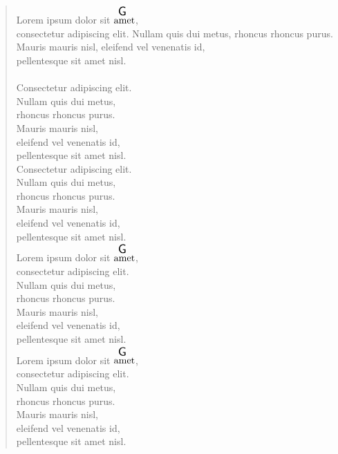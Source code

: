 \documentclass[twocolumn]{article}
\begin{document}
\begin{verse}

Lorem ipsum dolor sit $\overset{ \resizebox{0.3cm}{!}{\textsf{G}} }{\text{amet}}$, \\
consectetur adipiscing elit.
Nullam quis dui metus, 
rhoncus rhoncus purus. 
Mauris mauris nisl, 
eleifend vel venenatis id, \\
pellentesque sit amet nisl.\\

~\\

Consectetur adipiscing elit.\\
Nullam quis dui metus, \\
rhoncus rhoncus purus. \\
Mauris mauris nisl, \\
eleifend vel venenatis id, \\
pellentesque sit amet nisl.\\

Consectetur adipiscing elit.\\
Nullam quis dui metus, \\
rhoncus rhoncus purus. \\
Mauris mauris nisl, \\
eleifend vel venenatis id, \\
pellentesque sit amet nisl.\\

Lorem ipsum dolor sit $\overset{ \resizebox{0.3cm}{!}{\textsf{G}} }{\text{amet}}$, \\
consectetur adipiscing elit.\\
Nullam quis dui metus, \\
rhoncus rhoncus purus. \\
Mauris mauris nisl, \\
eleifend vel venenatis id, \\
pellentesque sit amet nisl.\\

Lorem ipsum dolor sit $\overset{ \resizebox{0.3cm}{!}{\textsf{G}} }{\text{amet}}$, \\
consectetur adipiscing elit.\\
Nullam quis dui metus, \\
rhoncus rhoncus purus. \\
Mauris mauris nisl, \\
eleifend vel venenatis id, \\
pellentesque sit amet nisl.\\


\end{verse}
\end{document}
